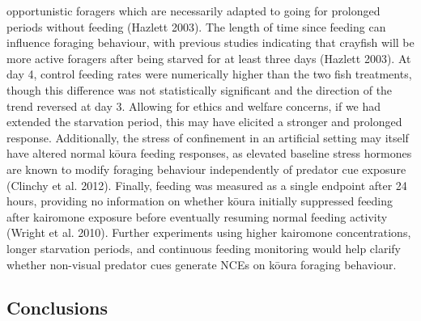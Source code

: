 \documentclass[
  12pt,
  a4paper,
  oneside]{scrbook}
\begin{document}
opportunistic foragers which are necessarily adapted to going for
prolonged periods without feeding (Hazlett 2003). The length of time
since feeding can influence foraging behaviour, with previous studies
indicating that crayfish will be more active foragers after being
starved for at least three days (Hazlett 2003). At day 4, control
feeding rates were numerically higher than the two fish treatments,
though this difference was not statistically significant and the
direction of the trend reversed at day 3. Allowing for ethics and
welfare concerns, if we had extended the starvation period, this may
have elicited a stronger and prolonged response. Additionally, the
stress of confinement in an artificial setting may itself have altered
normal kōura feeding responses, as elevated baseline stress hormones are
known to modify foraging behaviour independently of predator cue
exposure (Clinchy et al. 2012). Finally, feeding was measured as a
single endpoint after 24 hours, providing no information on whether
kōura initially suppressed feeding after kairomone exposure before
eventually resuming normal feeding activity (Wright et al. 2010).
Further experiments using higher kairomone concentrations, longer
starvation periods, and continuous feeding monitoring would help clarify
whether non-visual predator cues generate NCEs on kōura foraging
behaviour.

\subsection{Conclusions}\label{conclusions}
\end{document}
